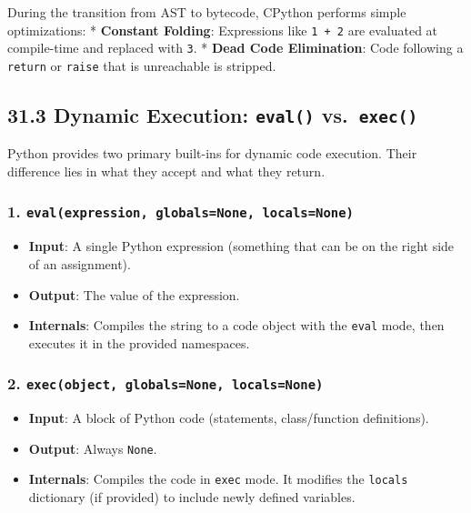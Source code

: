 During the transition from AST to bytecode, CPython performs simple
optimizations: * \textbf{Constant Folding}: Expressions like
\passthrough{\lstinline!1 + 2!} are evaluated at compile-time and
replaced with \passthrough{\lstinline!3!}. * \textbf{Dead Code
Elimination}: Code following a \passthrough{\lstinline!return!} or
\passthrough{\lstinline!raise!} that is unreachable is stripped.

\hypertarget{dynamic-execution-eval-vs.-exec}{%
\subsection{\texorpdfstring{31.3 Dynamic Execution: \texttt{eval()}
vs.~\texttt{exec()}}{31.3 Dynamic Execution: eval() vs.~exec()}}\label{dynamic-execution-eval-vs.-exec}}

Python provides two primary built-ins for dynamic code execution. Their
difference lies in what they accept and what they return.

\hypertarget{evalexpression-globalsnone-localsnone}{%
\subsubsection{\texorpdfstring{1.
\texttt{eval(expression,\ globals=None,\ locals=None)}}{1. eval(expression, globals=None, locals=None)}}\label{evalexpression-globalsnone-localsnone}}

\begin{itemize}
\tightlist
\item
  \textbf{Input}: A single Python expression (something that can be on
  the right side of an assignment).
\item
  \textbf{Output}: The value of the expression.
\item
  \textbf{Internals}: Compiles the string to a code object with the
  \passthrough{\lstinline!eval!} mode, then executes it in the provided
  namespaces.
\end{itemize}

\hypertarget{execobject-globalsnone-localsnone}{%
\subsubsection{\texorpdfstring{2.
\texttt{exec(object,\ globals=None,\ locals=None)}}{2. exec(object, globals=None, locals=None)}}\label{execobject-globalsnone-localsnone}}

\begin{itemize}
\tightlist
\item
  \textbf{Input}: A block of Python code (statements, class/function
  definitions).
\item
  \textbf{Output}: Always \passthrough{\lstinline!None!}.
\item
  \textbf{Internals}: Compiles the code in
  \passthrough{\lstinline!exec!} mode. It modifies the
  \passthrough{\lstinline!locals!} dictionary (if provided) to include
  newly defined variables.
\end{itemize}

